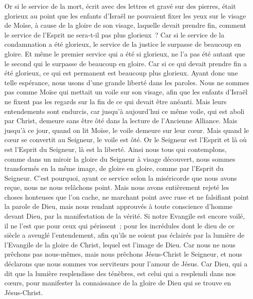 \begin{multicols}{2}
Or si le service de la mort, écrit avec des lettres et gravé sur des pierres, était glorieux au point que les enfants d'Israël ne pouvaient fixer les yeux sur le visage de Moïse, à cause de la gloire de son visage, laquelle devait prendre fin,
comment le service de l'Esprit ne sera-t-il pas plus glorieux~?
Car si le service de la condamnation a été glorieux, le service de la justice le surpasse de beaucoup en gloire.
Et même le premier service qui a été si glorieux, ne l'a pas été autant que le second qui le surpasse de beaucoup en gloire.
Car si ce qui devait prendre fin a été glorieux, ce qui est permanent est beaucoup plus glorieux.
Ayant donc une telle espérance, nous usons d'une grande liberté dans les paroles.
Nous ne sommes pas comme Moïse qui mettait un voile sur son visage, afin que les enfants d'Israël ne fixent pas les regards sur la fin de ce qui devait être anéanti.
Mais leurs entendements sont endurcis, car jusqu'à aujourd'hui ce même voile, qui est aboli par Christ, demeure sans être ôté dans la lecture de l'Ancienne Alliance.
Mais jusqu'à ce jour, quand on lit Moïse, le voile demeure sur leur cœur.
Mais quand le cœur se convertit au Seigneur, le voile est ôté.
Or le Seigneur est l'Esprit et là où est l'Esprit du Seigneur, là est la liberté.
Ainsi nous tous qui contemplons, comme dans un miroir la gloire du Seigneur à visage découvert, nous sommes transformés en la même image, de gloire en gloire, comme par l'Esprit du Seigneur.
\VerseOne{}C'est pourquoi, ayant ce service selon la miséricorde que nous avons reçue, nous ne nous relâchons point.
Mais nous avons entièrement rejeté les choses honteuses que l'on cache, ne marchant point avec ruse et ne falsifiant point la parole de Dieu, mais nous rendant approuvés à toute conscience d'homme devant Dieu, par la manifestation de la vérité.
Si notre Evangile est encore voilé, il ne l'est que pour ceux qui périssent~;
pour les incrédules dont le dieu de ce siècle a aveuglé l'entendement, afin qu'ils ne soient pas éclairés par la lumière de l'Evangile de la gloire de Christ, lequel est l'image de Dieu.
Car nous ne nous prêchons pas nous-mêmes, mais nous prêchons Jésus-Christ le Seigneur, et nous déclarons que nous sommes vos serviteurs pour l'amour de Jésus.
Car Dieu, qui a dit que la lumière resplendisse des ténèbres, est celui qui a resplendi dans nos cœurs, pour manifester la connaissance de la gloire de Dieu qui se trouve en Jésus-Christ.

\end{multicols}
